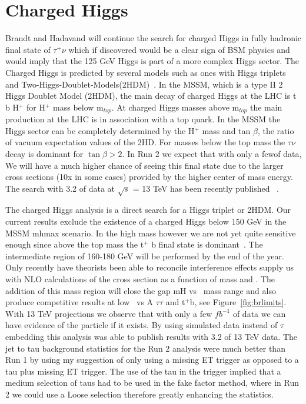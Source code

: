\section{Charged Higgs}
\label{chargedHiggs}
Brandt and Hadavand will continue the search for charged Higgs in fully hadronic final state of $\tau^+ \nu$ which if discovered would be a clear sign of BSM physics 
and would imply that the 125 GeV Higgs is part of a more complex Higgs sector. 
The Charged Higgs is predicted by several models such as ones with Higgs triplets and Two-Higgs-Doublet-Models(2HDM)~\cite{2hdm1,2hdm2,2hdm3}. 
In the MSSM, which is a type II 2 Higgs Doublet Model (2HDM), the main decay of charged Higgs at the LHC is t \too b H$^+$ for H$^+$ mass below m$_{top}$. At charged Higgs masses above m$_{top}$
the main production at the LHC is in association with a top quark.  In the MSSM the Higgs sector can be completely determined by the H$^+$ mass and tan $\beta$, the ratio of vacuum expectation values of the 2HD.
For masses below the top mass the $\tau \nu$ decay is dominant for $\tan \beta >2 $. In Run 2 we expect that with only a few\invfb of data,
We will have a much higher chance of seeing this final state due to the larger cross sections (10x in some cases) provided by the higher center of mass energy. The search with 3.2 \invfb of data at $\sqrt s$ = 13 TeV has been recently published ~\cite{taunu}.

The charged Higgs analysis is a direct search for a Higgs triplet or 2HDM.  Our current results exclude the existence of a charged Higgs below 150 GeV in the MSSM mhmax scenario. In the high mass however we are not yet quite sensitive enough 
since above the top mass the \Hp \too t$^+$ b final state is dominant~\cite{hptnu}. 
The intermediate region of 160-180 GeV will be performed by the end of the year.  Only recently have theorists been able to reconcile \ttbar interference effects supply us with NLO  calculations of the cross section as a function of mass and \tanb.
The addition of this mass region will close the gap mH vs \tanb\ mass range and also produce competitive results at low \tanb\ vs A \too $\tau \tau$ and \Hp \too t$^+$b, see Figure~\ref{fig:brlimits}.  With 13 TeV projections we observe that with only a few $fb^{-1}$ of data we can have evidence of the particle if it exists.
By using simulated \ttbar data instead of $\tau$ embedding this analysis was able to publish results with 3.2 \invfb of 13 TeV data. The jet to tau background statistics for the Run 2 analysis were much better than Run 1
by using my suggestion of only using a missing ET trigger as opposed to a tau plus missing ET trigger.  The use of the tau in the trigger implied that a medium selection of taus had to be used in the fake factor method, where in Run 2 we could use a Loose selection therefore greatly enhancing the statistics.

